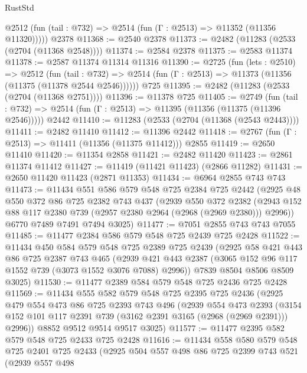 \begin{lexlean}{RustStd}
\begin{coremodule}
      @2512 (fun (tail : @732) => @2514 (fun (Γ : @2513) => @11352 (@11356 @11320)))))
    @2378
@11368 := @2540 @2378
@11373 := @2482 (@11283 (@2533 (@2704 (@11368 @2548))))
@11374 := @2584 @2378
@11375 := @2583 @11374
@11378 := @2587 @11374 @11314 @11316
@11390 := @2725
    (fun (lets : @2510) =>
    @2512
      (fun (tail : @732) =>
      @2514 (fun (Γ : @2513) => @11373 (@11356 (@11375 (@11378 @2544 @2546))))))
    @725
@11395 := @2482 (@11283 (@2533 (@2704 (@11368 @2751))))
@11396 := @11378 @725
@11405 := @2749
    (fun (tail : @732) => @2514 (fun (Γ : @2513) => @11395 (@11356 (@11375 (@11396 @2546)))))
    @2442
@11410 := @11283 (@2533 (@2704 (@11368 (@2543 @2443))))
@11411 := @2482 @11410
@11412 := @11396 @2442
@11418 := @2767 (fun (Γ : @2513) => @11411 (@11356 (@11375 @11412))) @2855
@11419 := @2650 @11410
@11420 := @11354 @2858
@11421 := @2482 @11420
@11423 := @2861 @11374 @11412
@11427 := @11419 (@11421 @11423) (@2866 @11282)
@11431 := @2650 @11420 @11423 (@2871 @11353)
@11434 := @6964 @2855 @743 @743
@11473 := @11434
    @551
    @586
    @579
    @548
    @725
    @2384
    @725
    @2442
    (@2925
      @48
      @550
      @372
      @86
      @725
      @2382
      @743
      @437
      (@2939
        @550
        @372
        @2382
        (@2943 @152 @88 @117 @2380 @739 (@2957 @2380 @2964 (@2968 (@2969 @2380))) @2996))
      @6770
      @7489
      @7491
      @7494
      @3025)
@11477 := @7051 @2855 @743 @743 @7055
@11485 := @11477 @2384 @586 @579 @548 @725 @2439 @725 @2428
@11522 := @11434
    @450
    @584
    @579
    @548
    @725
    @2389
    @725
    @2439
    (@2925
      @58
      @421
      @443
      @86
      @725
      @2387
      @743
      @465
      (@2939 @421 @443 @2387 (@3065 @152 @96 @117 @1552 @739 (@3073 @1552 @3076 @7088) @2996))
      @7839
      @8504
      @8506
      @8509
      @3025)
@11530 := @11477 @2389 @584 @579 @548 @725 @2436 @725 @2428
@11569 := @11434
    @555
    @582
    @579
    @548
    @725
    @2395
    @725
    @2436
    (@2925
      @479
      @554
      @473
      @86
      @725
      @2393
      @743
      @496
      (@2939
        @554
        @473
        @2393
        (@3154 @152 @101 @117 @2391 @739 (@3162 @2391 @3165 (@2968 (@2969 @2391))) @2996))
      @8852
      @9512
      @9514
      @9517
      @3025)
@11577 := @11477 @2395 @582 @579 @548 @725 @2433 @725 @2428
@11616 := @11434
    @558
    @580
    @579
    @548
    @725
    @2401
    @725
    @2433
    (@2925
      @504
      @557
      @498
      @86
      @725
      @2399
      @743
      @521
      (@2939
        @557
        @498

\end{coremodule}
\end{lexlean}
